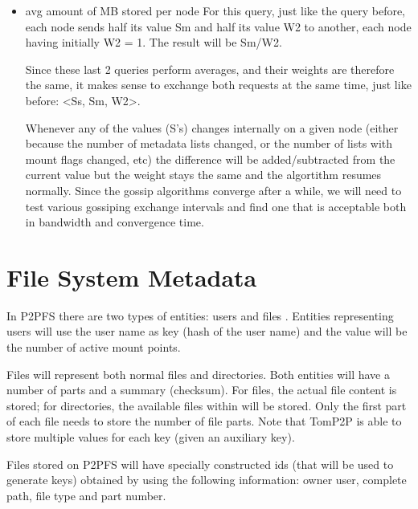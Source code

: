 \documentclass[times,9pt,article]{llncs}
\begin{document}
\begin{itemize}
\item avg amount of MB stored per node
For this query, just like the query before, each node sends half its value Sm and 
half its value W2 to another, each node having initially W2 = 1. The result will be
Sm/W2.

Since these last 2 queries perform averages, and their weights are therefore the same,
it makes sense to exchange both requests at the same time, just like before:
<Ss, Sm, W2>.

Whenever any of the values (S's) changes internally on a given node (either because
the number of metadata lists changed, or the number of lists with mount flags changed,
etc) the difference will be added/subtracted from the current value but the weight 
stays the same and the algortithm resumes normally.
Since the gossip algorithms converge after a while, we will need to test various
gossiping exchange intervals and find one that is acceptable both in bandwidth and
convergence time.

\end{itemize} 

\section{File System Metadata}

In P2PFS there are two types of entities: users and files . Entities representing
users will use the user name as key (hash of the user name) and the value will 
be the number of active mount points. 

Files will represent both normal files and directories. Both entities will have 
a number of parts and a summary (checksum). For files, the actual file content
is stored; for directories, the available files within will be stored. Only the
first part of each file needs to store the number of file parts. Note that 
TomP2P is able to store multiple values for each key (given an auxiliary key).   

Files stored on P2PFS will have specially constructed ids (that will be used to
generate keys) obtained by using the following information: owner user, complete 
path, file type and part number.

\end{document}
